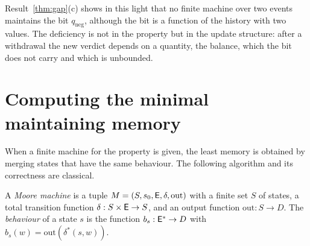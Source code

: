 Result~\ref{thm:gap}(c) shows in this light that no finite machine over two events maintains the bit $q_{\mathrm{neg}}$, although the bit is a function of the history with two values. The deficiency is not in the property but in the update structure: after a withdrawal the new verdict depends on a quantity, the balance, which the bit does not carry and which is unbounded.

\section{Computing the minimal maintaining memory}\label{sec:moore}

When a finite machine for the property is given, the least memory is obtained by merging states that have the same behaviour. The following algorithm and its correctness are classical.

\begin{definition}\label{def:moore}
A \emph{Moore machine} is a tuple $M=(S,s_0,\mathsf{E},\delta,\mathrm{out})$ with a finite set $S$ of states, a total transition function $\delta:S\times\mathsf{E}\to S$, and an output function $\mathrm{out}:S\to D$. The \emph{behaviour} of a state $s$ is the function $b_s:\mathsf{E}^{*}\to D$ with $b_s(w)=\mathrm{out}(\delta^{*}(s,w))$.
\end{definition}

